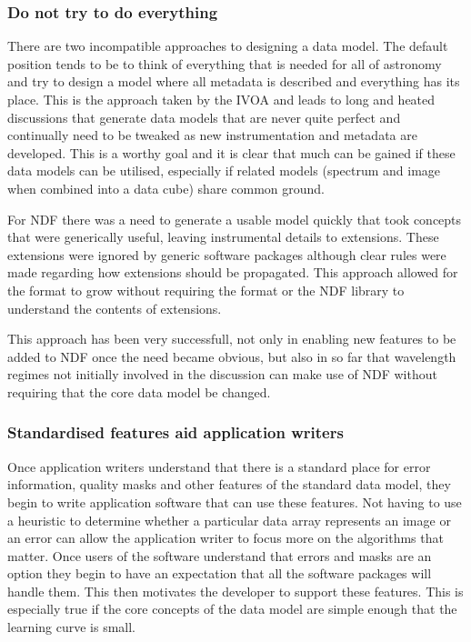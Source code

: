 \documentclass[final,authoryear,5p,times,twocolumn]{elsarticle}
\begin{document}
{\subsubsection{Do not try to do everything}

There are two incompatible approaches to designing a data model. The
default position tends to be to think of everything that is needed for
all of astronomy and try to design a model where all metadata is
described and everything has its place. This is the approach taken by
the IVOA \citep[see e.g.][]{2012arXiv1204.3055M} and leads to long and
heated discussions that generate data models that are never quite
perfect and continually need to be tweaked as new instrumentation and
metadata are developed. This is a worthy goal and it is clear that
much can be gained if these data models can be utilised, especially if
related models (spectrum and image when combined into a data cube)
share common ground.

For NDF there was a need to generate a usable model quickly that took
concepts that were generically useful, leaving instrumental details to
extensions. These extensions were ignored by generic software packages
although clear rules were made regarding how extensions should be
propagated. This approach allowed for the format to grow without
requiring the format or the NDF library to understand the
contents of extensions.

This approach has been very successfull, not only in enabling new
features to be added to NDF once the need became obvious, but also
in so far that wavelength regimes not initially involved in the
discussion can make use of NDF without requiring that the core data
model be changed.

\subsubsection{Standardised features aid application writers}

Once application writers understand that there is a standard place for
error information, quality masks and other features of the standard
data model, they begin to write application software that can use
these features. Not having to use a heuristic to determine whether a
particular data array represents an image or an error can allow the
application writer to focus more on the algorithms that matter. Once
users of the software understand that errors and masks are an option
they begin to have an expectation that all the software packages will
handle them. This then motivates the developer to support these
features.  This is especially true if the core concepts of the data
model are simple enough that the learning curve is small.

}
\end{document}
